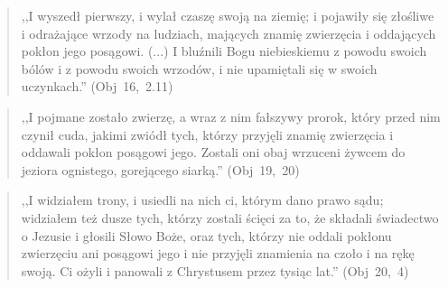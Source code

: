 \documentclass[10pt,a4paper,oneside]{article}
\begin{document}
\begin{quote}
,,I wyszedł pierwszy, i wylał czaszę swoją na ziemię; i pojawiły się złośliwe i odrażające wrzody na ludziach, mających znamię zwierzęcia i oddających pokłon jego posągowi. (...) I bluźnili Bogu niebieskiemu z powodu swoich bólów i z powodu swoich wrzodów, i nie upamiętali się w swoich uczynkach.'' \mbox{(Obj 16, 2.11)}
\end{quote}
\begin{quote}
,,I pojmane zostało zwierzę, a wraz z nim fałszywy prorok, który przed nim czynił cuda, jakimi zwiódł tych, którzy przyjęli znamię zwierzęcia i oddawali pokłon posągowi jego. Zostali oni obaj wrzuceni żywcem do jeziora ognistego, gorejącego siarką.'' \mbox{(Obj 19, 20)}
\end{quote}
\begin{quote}
,,I widziałem trony, i usiedli na nich ci, którym dano prawo sądu; widziałem też dusze tych, którzy zostali ścięci za to, że składali świadectwo o Jezusie i głosili Słowo Boże, oraz tych, którzy nie oddali pokłonu zwierzęciu ani posągowi jego i nie przyjęli znamienia na czoło i na rękę swoją. Ci ożyli i panowali z Chrystusem przez tysiąc lat.'' \mbox{(Obj 20, 4)}
\end{quote}
\end{document}
